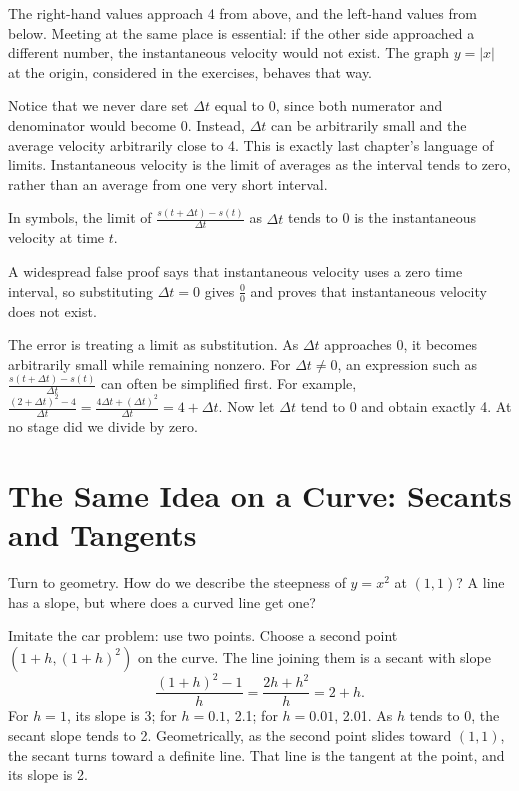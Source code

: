 The right-hand values approach 4 from above, and the left-hand values from below. Meeting at the same place is essential: if the other side approached a different number, the instantaneous velocity would not exist. The graph $y=|x|$ at the origin, considered in the exercises, behaves that way.

Notice that we never dare set $\Delta t$ equal to 0, since both numerator and denominator would become 0. Instead, $\Delta t$ can be arbitrarily small and the average velocity arbitrarily close to 4. This is exactly last chapter's language of limits. Instantaneous velocity is the limit of averages as the interval tends to zero, rather than an average from one very short interval.

In symbols, the limit of $\frac{s(t+\Delta t)-s(t)}{\Delta t}$ as $\Delta t$ tends to 0 is the instantaneous velocity at time $t$.

\begin{fanli}
A widespread false proof says that instantaneous velocity uses a zero time interval, so substituting $\Delta t=0$ gives $\frac{0}{0}$ and proves that instantaneous velocity does not exist.

The error is treating a limit as substitution. As $\Delta t$ approaches 0, it becomes arbitrarily small while remaining nonzero. For $\Delta t\neq 0$, an expression such as $\frac{s(t+\Delta t)-s(t)}{\Delta t}$ can often be simplified first. For example, $\frac{(2+\Delta t)^2-4}{\Delta t}=\frac{4\Delta t+(\Delta t)^2}{\Delta t}=4+\Delta t$. Now let $\Delta t$ tend to 0 and obtain exactly 4. At no stage did we divide by zero.
\end{fanli}

\section{The Same Idea on a Curve: Secants and Tangents}

Turn to geometry. How do we describe the steepness of $y=x^2$ at $(1,1)$? A line has a slope, but where does a curved line get one?

Imitate the car problem: use two points. Choose a second point $(1+h,(1+h)^2)$ on the curve. The line joining them is a secant with slope
\[
\frac{(1+h)^2-1}{h}=\frac{2h+h^2}{h}=2+h.
\]
For $h=1$, its slope is 3; for $h=0.1$, 2.1; for $h=0.01$, 2.01. As $h$ tends to 0, the secant slope tends to 2. Geometrically, as the second point slides toward $(1,1)$, the secant turns toward a definite line. That line is the tangent at the point, and its slope is 2.

